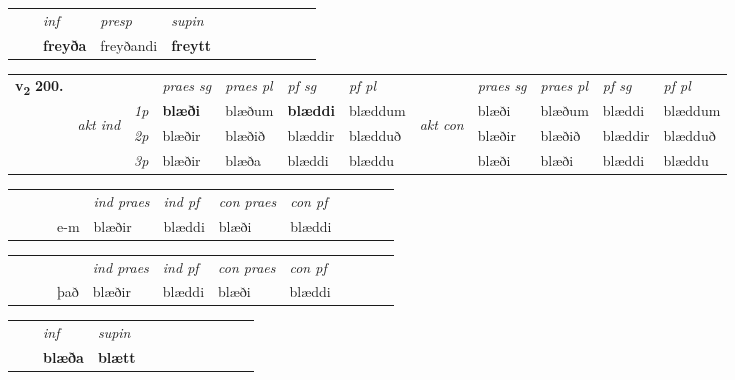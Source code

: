 \begin{tabular}{llllllllllll}
 & & \textit{inf}     & \textit{presp} & \textit{supin}       \\*
  & & \textbf{freyða}      & freyðandi &  \textbf{freytt}   \\*
\cmidrule{1-12}
\end{tabular}



\begin{tabular}{llllllllllll} \toprule
\multirow{4}{*}{{{\textbf{v{\textsubscript{2}}} \Large{\textbf{200.}}}}}  & &   &  \textit{praes sg}  & \textit{praes pl}  &\textit{ pf sg} & \textit{pf pl} &  &  \textit{praes sg}  & \textit{praes pl}  & \textit{pf sg} & \textit{pf pl } \\*
	\cmidrule{4-7} \cmidrule{9-12}
 & \multirow{3}{*}{\begin{turn}{90}\textit{akt ind}\end{turn}} & {\textit{1p}} & \textbf{blæði} & blæðum    & \textbf{blæddi} & blæddum & \multirow{3}{*}{\begin{turn}{90}\textit{akt con}\end{turn}} &blæði & blæðum & blæddi & blæddum\\*
& &  {\textit{2p}} &  blæðir  & blæðið   & blæddir & blædduð & & blæðir & blæðið & blæddir & blædduð \\*
& &  {\textit{3p}} & blæðir & blæða   & blæddi & blæddu & & blæði & blæði& blæddi & blæddu  \\*
\cmidrule{4-7} \cmidrule{9-12}
\end{tabular}


\begin{tabular}{llllllllllll}
 & &  & &  \textit{ind praes} & \textit{ind pf} & \textit{con praes} & \textit{con pf} \\*
&  & & e-m & blæðir & blæddi & blæði & blæddi \\*
\cmidrule{5-9}
\end{tabular}


\begin{tabular}{llllllllllll}
 & &  & &  \textit{ind praes} & \textit{ind pf} & \textit{con praes} & \textit{con pf} \\*
&  & & það & blæðir & blæddi & blæði & blæddi \\*
\cmidrule{5-9}
\end{tabular}


\begin{tabular}{llllllllllll}
 & & \textit{inf}      & \textit{supin}       \\*
  & & \textbf{blæða}       &  \textbf{blætt}   \\*
\cmidrule{1-12}
\end{tabular}



